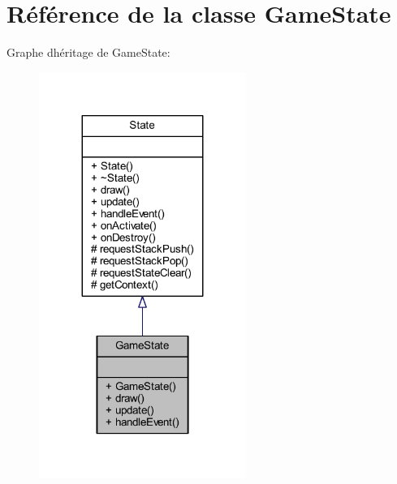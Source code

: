\hypertarget{class_game_state}{}\section{Référence de la classe Game\+State}
\label{class_game_state}


Graphe d\textquotesingle{}héritage de Game\+State\+:\nopagebreak
\begin{figure}[H]
\begin{center}
\leavevmode
\includegraphics[width=191pt]{class_game_state__inherit__graph}
\end{center}
\end{figure}


